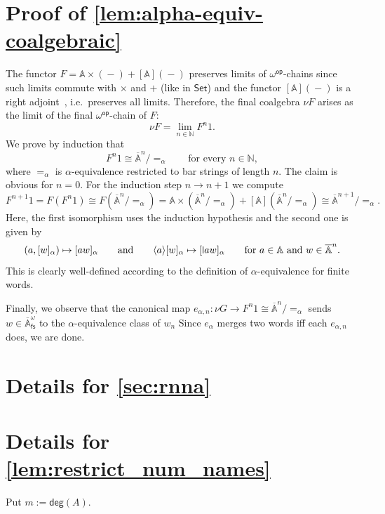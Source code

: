 \documentclass[final,a4paper,UKenglish,thm-restate,autoref,numberwithinsect]{lipics-v2021}
\newcommand{\midmid}{\hspace{0.2ex}{\rule[-0.1ex]{0.6pt}{1.65ex}}\hspace{0.2ex}}
\newcommand{\newletter}[1]{{\midmid}#1}
\newcommand{\degree}{\mathsf{deg}}
\newcommand{\barA}{\overline{\names}}
\numberwithin{equation}{section}
\newcommand{\dash}{\mathop{-}}
\newcommand{\braket}[1]{\langle #1 \rangle}
\newcommand{\fs}{\mathsf{fs}}
\newcommand{\Nat}{{\mathbb{N}}}
\newcommand{\Set}{\mathsf{Set}}
\newcommand{\+}[1]{\mathcal{#1}\xspace}
\newcommand{\op}{{\mathsf{op}}}
\newcommand{\names}{\mathbb{A}}
\theoremstyle{definition}
\begin{document}
\section*{Proof of \autoref{lem:alpha-equiv-coalgebraic}}
  The functor $F=\names\times (\dash) + [\names](\dash)$ preserves
  limits of $\omega^\op$-chains since such limits commute with
  $\times$ and $+$ (like in $\Set$) and the functor
  $[\names](\dash)$ is a right adjoint~\cite[Thm. 4.12]{Pitts13}, i.e.~preserves all limits. Therefore, the final
  coalgebra $\nu F$ arises as the limit of the final
  $\omega^\op$-chain of $F$:
  \[
    \nu F = \lim_{n\in \Nat} F^n 1.
  \]
  We prove by induction that
  \[
    F^n1 \cong \barA^n/{=_\alpha}\qquad\text{for every $n\in \Nat$},
  \]
  where $=_\alpha$ is $\alpha$-equivalence restricted to bar strings
  of length $n$.  The claim is obvious for $n=0$. For the induction
  step $n\to n+1$ we compute
  \[
    F^{n+1}1
    =
    F(F^n1)\cong F(\barA^n/{=_\alpha})
    =
    \names\times (\barA^n/{=_\alpha}) + [\names](\barA^n/{=_\alpha})
    \cong \barA^{n+1}/{=_\alpha}.
  \]
  Here, the first isomorphism uses the induction hypothesis and the
  second one is given by
  \[
    (a,[w]_\alpha) \mapsto  [aw]_\alpha
    \qquad\text{and}\qquad
    \braket{a} [w]_\alpha \mapsto [\newletter aw]_\alpha
    \qquad\text{for $a\in \names$ and $w\in \barA^n$.}
  \]
  This is clearly well-defined %
  according to the definition of $\alpha$-equivalence for finite
  words.

  Finally, we observe that the canonical map
  $e_{\alpha,n}\colon \nu G\to F^n1 \cong \barA^n/{=_\alpha}$ sends
  $w\in \barA^\omega_\fs$ to the $\alpha$-equivalence class of
  $w_n$ Since $e_\alpha$ merges two words iff each $e_{\alpha,n}$
  does, we are done. %

\section{Details for \autoref{sec:rnna}}

\section*{Details for \autoref{lem:restrict_num_names}}

  Put $m:=\degree(A)$. 
\end{document}

